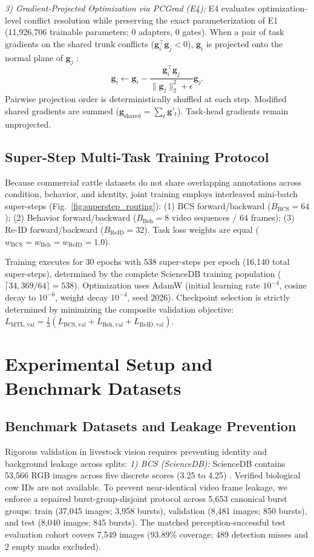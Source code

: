 \documentclass[conference]{IEEEtran}
\begin{document}
\textit{3) Gradient-Projected Optimization via PCGrad (E4):} E4 evaluates optimization-level conflict resolution while preserving the exact parameterization of E1 (11,926,706 trainable parameters; 0 adapters, 0 gates). When a pair of task gradients on the shared trunk conflicts ($\mathbf{g}_i^\top \mathbf{g}_j < 0$), $\mathbf{g}_i$ is projected onto the normal plane of $\mathbf{g}_j$ \cite{yu2020pcgrad}:
\begin{equation}
\mathbf{g}_i \leftarrow \mathbf{g}_i - \frac{\mathbf{g}_i^\top \mathbf{g}_j}{\|\mathbf{g}_j\|_2^2 + \epsilon} \mathbf{g}_j.
\end{equation}
Pairwise projection order is deterministically shuffled at each step. Modified shared gradients are summed ($\mathbf{g}_{\mathrm{shared}} = \sum_t \mathbf{g}'_t$). Task-head gradients remain unprojected.

\subsection{Super-Step Multi-Task Training Protocol}
Because commercial cattle datasets do not share overlapping annotations across condition, behavior, and identity, joint training employs interleaved mini-batch super-steps (Fig.~\ref{fig:superstep_routing}): (1) BCS forward/backward ($B_{\mathrm{BCS}} = 64$); (2) Behavior forward/backward ($B_{\mathrm{Beh}} = 8$ video sequences / 64 frames); (3) Re-ID forward/backward ($B_{\mathrm{ReID}} = 32$). Task loss weights are equal ($w_{\mathrm{BCS}} = w_{\mathrm{Beh}} = w_{\mathrm{ReID}} = 1.0$).

Training executes for 30 epochs with 538 super-steps per epoch (16,140 total super-steps), determined by the complete ScienceDB training population ($\lceil 34{,}369 / 64 \rceil = 538$). Optimization uses AdamW (initial learning rate $10^{-4}$, cosine decay to $10^{-6}$, weight decay $10^{-4}$, seed 2026). Checkpoint selection is strictly determined by minimizing the composite validation objective: $L_{\mathrm{MTL,val}} = \frac{1}{3}( L_{\mathrm{BCS,val}} + L_{\mathrm{Beh,val}} + L_{\mathrm{ReID,val}} )$.

\section{Experimental Setup and Benchmark Datasets}

\subsection{Benchmark Datasets and Leakage Prevention}
Rigorous validation in livestock vision requires preventing identity and background leakage across splits:
\textit{1) BCS (ScienceDB):} ScienceDB contains 53,566 RGB images across five discrete scores (3.25 to 4.25) \cite{sciencedb2024bcs}. Verified biological cow IDs are not available. To prevent near-identical video frame leakage, we enforce a repaired burst-group-disjoint protocol across 5,653 canonical burst groups: train (37,045 images; 3,958 bursts), validation (8,481 images; 850 bursts), and test (8,040 images; 845 bursts). The matched perception-successful test evaluation cohort covers 7,549 images ($93.89\%$ coverage; 489 detection misses and 2 empty masks excluded).
\end{document}

